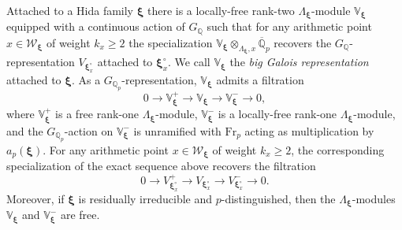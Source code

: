 \documentclass[a4paper,11pt]{amsart}
\theoremstyle{plain}
\theoremstyle{definition}
\theoremstyle{remark}
\newcommand{\bb}{\mathbb}
\newcommand{\cl}{\mathcal}
\newcommand{\Fr}{\mathrm{Fr}}
\newcommand{\hf}{{\mathbf{f}}}
\numberwithin{equation}{section}
\begin{document}


Attached to a Hida family $\bm{\xi}$ %
there is a locally-free rank-two $\Lambda_{\bm{\xi}}$-module $\bb{V}_{\bm{\xi}}$ equipped with a continuous action of $G_{\bb{Q}}$ such that for any arithmetic point $x\in \cl{W}_{\bm{\xi}}$ of weight $k_x\geq 2$ the specialization $\bb{V}_{\bm{\xi}}\otimes_{\Lambda_{\bm{\xi}},x}\overline{\bb{Q}}_p$ recovers the $G_{\bb{Q}}$-representation $V_{\bm{\xi}_x^\circ}$ attached to $\bm{\xi}_{x}^\circ$. We call $\bb{V}_{\bm{\xi}}$ the \emph{big Galois representation} attached to $\bm{\xi}$. As a $G_{\bb{Q}_p}$-representation, $\bb{V}_{\bm{\xi}}$ admits a filtration
\[
0\rightarrow \bb{V}_{\bm{\xi}}^+\rightarrow \bb{V}_{\bm{\xi}}\rightarrow \bb{V}_{\bm{\xi}}^-\rightarrow 0,
\]
where $\bb{V}_{\bm{\xi}}^{+}$ is a free rank-one $\Lambda_{\bm{\xi}}$-module, $\bb{V}_{\bm{\xi}}^-$ is a locally-free rank-one $\Lambda_{\bm{\xi}}$-module, and the $G_{\bb{Q}_p}$-action on $\bb{V}_{\bm{\xi}}^-$ is unramified with $\Fr_p$ acting as multiplication by $a_p(\bm{\xi})$. For any arithmetic point $x\in \cl{W}_{\bm{\xi}}$ of weight $k_x\geq 2$, the corresponding specialization of the exact sequence above recovers the filtration
\[
0\rightarrow V_{\bm{\xi}_x^\circ}^+\rightarrow V_{\bm{\xi}_x^\circ}\rightarrow V_{\bm{\xi}_x^\circ}^-\rightarrow 0.
\]
Moreover, if $\bm{\xi}$ is residually irreducible and $p$-distinguished, then the $\Lambda_{\bm{\xi}}$-modules $\bb{V}_{\bm{\xi}}$ and $\bb{V}_{\bm{\xi}}^{-}$ are free.
\end{document}
